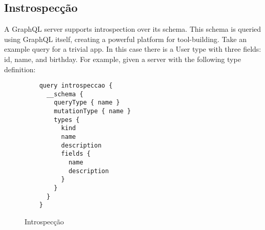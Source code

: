 \subsection[Instrospecção]{Instrospecção}

A GraphQL server supports introspection over its schema. This schema is queried using GraphQL itself, creating a powerful platform for tool-building. Take an example query for a trivial app. In this case there is a User type with three fields: id, name, and birthday. For example, given a server with the following type definition:

\begin{figure}[H]
  \centering
  \begin{verbatim}
    query introspeccao {
      __schema {
        queryType { name }
        mutationType { name }
        types {
          kind
          name
          description
          fields {
            name
            description
          }
        }
      }
    }
  \end{verbatim}
  \caption{Introspecção}
\end{figure}
